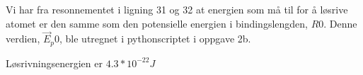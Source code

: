 \subsubsection{}

Vi har fra resonnementet i ligning 31 og 32 at energien som må til for å løsrive atomet er den samme som den potensielle energien i bindingslengden, $R0$.
Denne verdien, $\vec{E}_p0$, ble utregnet i pythonscriptet i oppgave 2b.

\begin{figure}[H]
\centering

\caption{}
\end{figure}

Løsrivningsenergien er $4.3 * 10^{-22}J$

\newpage




\newpage